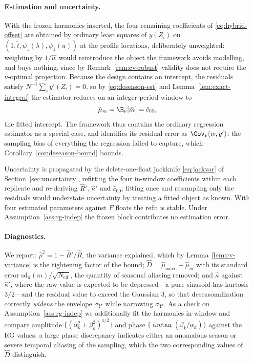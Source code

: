 \paragraph{Estimation and uncertainty.} With the frozen harmonics
inserted, the four remaining coefficients of \eqref{eq:hybrid-offset} are
obtained by ordinary least squares of $y(Z_i)$ on
$(1,\tilde t,\psi_1(\lambda),\psi_1(u))$ at the profile locations,
deliberately unweighted: weighting by $1/\hat w$ would reintroduce the
object the framework avoids modelling, and buys nothing, since by
Remark~\ref{rem:cv-robust} validity does not require the
$\nu$-optimal projection. Because the design contains an intercept, the
residuals satisfy $N^{-1}\sum_i y'(Z_i)=0$, so by
\eqref{eq:deseason-est} and Lemma~\ref{lem:exact-integral} the estimator
reduces on an integer-period window to
\begin{equation}
  \hat\mu_m=\E_\nu[\hat m]=\hat c_{00} ,
  \label{eq:deseason-collapse}
\end{equation}
the fitted intercept. The framework thus contains the ordinary
regression estimator as a special case, and identifies its residual
error as $\Cov_\nu(w,y')$: the sampling bias of everything the
regression failed to capture, which Corollary~\ref{cor:deseason-bound}
bounds.

Uncertainty is propagated by the delete-one-float jackknife
\eqref{eq:jackvar} of Section~\ref{sec:uncertainty}, refitting the four
in-window coefficients within each replicate and re-deriving $\hat R'$,
$\hat\kappa'$ and $\hat c_{00}$; fitting once and resampling only the
residuals would understate uncertainty by treating a fitted object as
known. With four estimated parameters against $F$ floats the refit is
stable. Under Assumption~\ref{ass:rg-indep} the frozen block contributes
no estimation error.

\paragraph{Diagnostics.} We report: $\hat\rho^2=1-\hat R'/\hat R$, the
variance explained, which by Lemma~\ref{lem:cv-variance} is the
tightening factor of the bound; $\hat
D=\hat\mu_{\mathrm{naive}}-\hat\mu_m$ with its standard error
$\widehat{\mathrm{sd}}_\pi(m)/\sqrt{N_{\mathrm{eff}}}$, the quantity of
seasonal aliasing removed; and $\hat\kappa$ against $\hat\kappa'$, where
the raw value is expected to be depressed---a pure sinusoid has
kurtosis $3/2$---and the residual value to exceed the Gaussian $3$, so
that deseasonalization correctly \emph{widens} the envelope
$\overline{\sigma}_{Y'}$ while narrowing $\sigma_{Y'}$. As a check on
Assumption~\ref{ass:rg-indep} we additionally fit the harmonics
in-window and compare amplitude
$\{(\alpha_k^2+\beta_k^2)^{1/2}\}$ and phase
$\{\arctan(\beta_k/\alpha_k)\}$ against the RG values; a large phase
discrepancy indicates either an anomalous season or severe temporal
aliasing of the sampling, which the two corresponding values of $\hat D$
distinguish.


